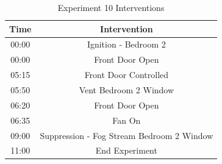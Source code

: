 \documentclass{article}
\begin{document}
\begin{table}[H]
	\centering
	\caption{Experiment 10 Interventions}
	\begin{tabular}{|c|c|} 
		\hline
		Time & Intervention \\ \hline \hline
		00:00 & Ignition - Bedroom 2 \\ \hline
		00:00 & Front Door Open \\ \hline
		05:15 & Front Door Controlled \\ \hline
		05:50 & Vent Bedroom 2 Window\\ \hline
		06:20 & Front Door Open \\ \hline
		06:35 & Fan On \\ \hline
		09:00 & Suppression - Fog Stream Bedroom 2 Window\\ \hline
		11:00 & End Experiment\\ \hline
	\end{tabular}
	\label{Table:Exp10Interventions}
\end{table}

\clearpage
\end{document}
